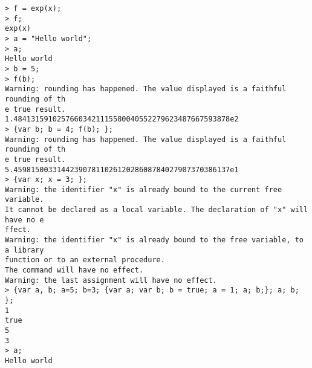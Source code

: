 \begin{center}\begin{minipage}{15cm}\begin{Verbatim}[frame=single]
> f = exp(x);
> f;
exp(x)
> a = "Hello world";
> a;
Hello world
> b = 5;
> f(b);
Warning: rounding has happened. The value displayed is a faithful rounding of th
e true result.
1.48413159102576603421115580040552279623487667593878e2
> {var b; b = 4; f(b); };
Warning: rounding has happened. The value displayed is a faithful rounding of th
e true result.
5.45981500331442390781102612028608784027907370386137e1
> {var x; x = 3; };
Warning: the identifier "x" is already bound to the current free variable.
It cannot be declared as a local variable. The declaration of "x" will have no e
ffect.
Warning: the identifier "x" is already bound to the free variable, to a library 
function or to an external procedure.
The command will have no effect.
Warning: the last assignment will have no effect.
> {var a, b; a=5; b=3; {var a; var b; b = true; a = 1; a; b;}; a; b; };
1
true
5
3
> a;
Hello world
\end{Verbatim}
\end{minipage}\end{center}

